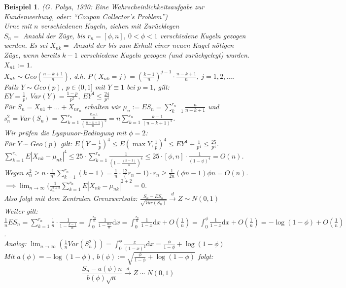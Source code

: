 \documentclass[a4paper,11pt]{book}
\def\folgt{\ensuremath{\implies}}
\def\d{\mbox{d}}
\def\dto{\stackrel{d}{\rightarrow}}
\newtheorem{Bsp}{Beispiel}[chapter]
\theoremstyle{nonumberplain}
\begin{document}
\begin{Bsp}(G. Polya, 1930: Eine Wahrscheinlichkeitsaufgabe zur Kundenwerbung, oder: \textquotedblleft Coupon Collector's Problem\textquotedblright) \label{Bsp5.4} \\
Urne mit $n$ verschiedenen Kugeln, ziehen mit Zurücklegen \\
$S_n =$ Anzahl der Züge, bis $r_n = [\phi, n],\ 0<\phi<1$ verschiedene Kugeln gezogen werden. Es sei $X_{nk} =$ Anzahl der bis zum Erhalt einer neuen Kugel nötigen Züge, wenn bereits $k-1$ verschiedene Kugeln gezogen (und zurückgelegt) wurden. $X_{n1} := 1$. \\
$X_{nk} \sim Geo(\frac{n-k+1}{n})$, d.h. $P(X_{nk} = j) = (\frac{k-1}{n})^{j-1}\cdot\frac{n-k+1}{n},\ j=1,2,\dots$. \\
Falls $Y \sim Geo(p),\ p\in(0,1]$ mit $Y \equiv 1$ bei $p=1$, gilt: \\
$EY = \frac{1}{p},\ Var(Y) = \frac{1-p}{p^2},\ EY^4\leq\frac{24}{p^4}$ \\
Für $S_n = X_{n1} + \dots + X_{nr_n}$ erhalten wir $\mu_n := ES_n = \sum_{k=1}^{r_n}\frac{n}{n-k+1}$ und $s_n^2 = Var(S_n) = \sum_{k=1}^{r_n}\frac{\frac{k-1}{n}}{(\frac{n-k+1}{n})^2} = n\sum_{k=1}^{r_n}\frac{k-1}{(n-k+1)^2}$. \\
Wir prüfen die Lyapunor-Bedingung mit $\phi = 2$: \\
Für $Y \sim Geo(p)$ gilt: $E(Y-\frac{1}{p})^4 \leq E(\max{Y,\frac{1}{p}})^4 \leq EY^4 + \frac{1}{p^4} \leq \frac{25}{p^4}$. $\sum_{k=1}^{r_n}E|X_{nk}-\mu_{nk}|^4 \leq 25\cdot\sum_{k=1}^{r_n}\frac{1}{(1-\frac{(k-1)}{n})^4} \leq 25\cdot[\phi,n]\cdot\frac{1}{(1-\phi)^4} = O(n)$. \\
Wegen $s_n^2 \geq n\cdot\frac{1}{n^2}\sum_{k=1}^{r_n}(k-1) = \frac{1}{n}\cdot\frac{1 2}(r_n - 1)\cdot r_n \geq \frac{1}{2n}(\phi n - 1)\phi n = O(n).$ \\
$\folgt \lim_{n\to\infty}(\frac{1}{s_n^{2+2}}\sum_{k=1}^{r_n}E|X_{nk}-\mu_{nk}|^{2+2} = 0$. \\
Also folgt mit dem Zentralen Grenzwertsatz: $\frac{S_n - ES_n}{\sqrt{Var (S_n)}} \dto Z\sim N(0,1)$ \\
Weiter gilt: $\frac{1}{n}ES_n = \sum_{k=1}^{r_n}\frac{1}{n}\cdot\frac{1}{1-\frac{k-1}{n}} = \int_0^{\frac{r_n}{n}}\frac{1}{1-\frac{nx}{n}}\d x = \int_0^{\frac{r_n}{n}}\frac{1}{1-x}\d x + O(\frac{1}{n}) = \int_0^\phi \frac{1}{1-x}\d x + O(\frac{1}{n}) = -\log(1-\phi) + O(\frac{1}{n})$. \\
Analog: $\lim_{n\to\infty}(\frac{1}{n}Var(S_n^2)) = \int_0^\phi\frac{x}{(1-x)^2}\d x = \frac{\phi}{1-\phi} + \log(1-\phi)$ \\
Mit $a(\phi) = -\log(1-\phi),\ b(\phi) := \sqrt{\frac{\phi}{1-\phi} + \log(1-\phi)}$ folgt:
$$\frac{S_n - a(\phi)n}{b(\phi)\sqrt{n}} \dto Z \sim N(0,1)$$
\end{Bsp}
\end{document}
